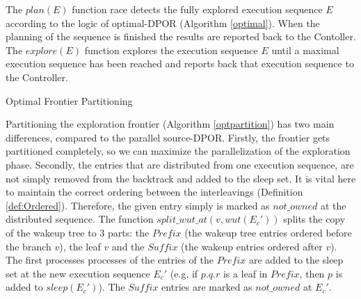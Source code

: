 The $plan(E)$ function race detects the fully explored execution sequence $E$ according to the logic of optimal-DPOR 
(Algorithm \ref{optimal}). When the planning of the sequence is finished the results are reported back to the Contoller.
The $explore(E)$ function explores the execution sequence $E$ until a maximal execution sequence
has been reached and reports back that execution sequence to the Controller.


\begin{algorithm}
    \caption{Optimal Frontier Partitioning}
    \label{optpartition}

\end{algorithm}

Partitioning the exploration frontier (Algorithm \ref{optpartition}) has two main differences, compared to the parallel source-DPOR.
Firstly, the frontier gets partitioned completely, so we can maximize the parallelization of the exploration phase. 
Secondly, the entries that are distributed from one execution sequence, are not simply removed from the backtrack and added to
the sleep set. It is vital here to maintain the correct ordering between the interleavings (Definition \ref{def:Ordered}). Therefore,
the given entry simply is marked as $not\_owned$ at the distributed sequence. The function  $split\_wut\_at(v, wut(E_c'))$
splits the copy of the wakeup tree to 3 parts: the $Prefix$ (the wakeup tree entries ordered before the branch $v$), the leaf $v$
and the $Suffix$ (the wakeup entries ordered after $v$). The first processes processes of the entries of
the $Prefix$ are added to the sleep set at the new execution sequence $E_c'$ (e.g. if $p.q.r$ is a leaf in $Prefix$, then $p$ is added to
$sleep(E_c')$). The $Suffix$ entries are marked as $not\_owned$ at $E_c'$.

